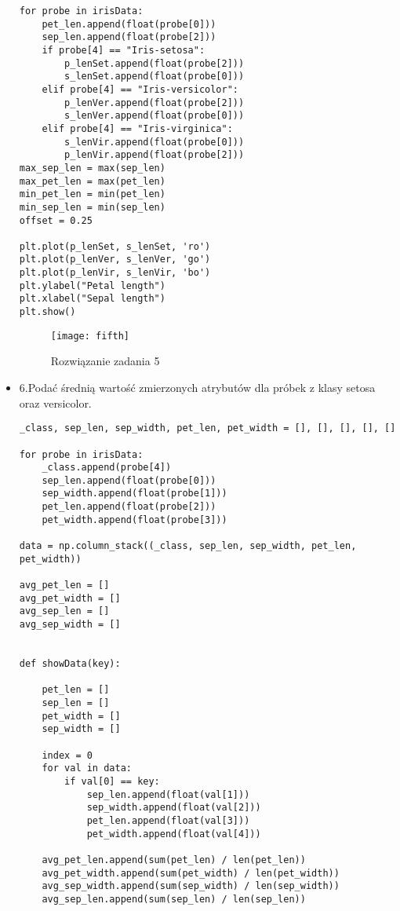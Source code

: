 \documentclass[12pt,a4paper]{article}
\begin{document}
\begin{itemize}
\begin{lstlisting}
for probe in irisData:
    pet_len.append(float(probe[0]))
    sep_len.append(float(probe[2]))
    if probe[4] == "Iris-setosa":
        p_lenSet.append(float(probe[2]))
        s_lenSet.append(float(probe[0]))
    elif probe[4] == "Iris-versicolor":
        p_lenVer.append(float(probe[2]))
        s_lenVer.append(float(probe[0]))
    elif probe[4] == "Iris-virginica":
        s_lenVir.append(float(probe[0]))
        p_lenVir.append(float(probe[2]))
max_sep_len = max(sep_len)
max_pet_len = max(pet_len)
min_pet_len = min(pet_len)
min_sep_len = min(sep_len)
offset = 0.25

plt.plot(p_lenSet, s_lenSet, 'ro')
plt.plot(p_lenVer, s_lenVer, 'go')
plt.plot(p_lenVir, s_lenVir, 'bo')
plt.ylabel("Petal length")
plt.xlabel("Sepal length")
plt.show()
	\end{lstlisting}
		\begin{figure}[h]
                        \texttt{[image: fifth]}
                        \centering
			\caption{Rozwiązanie zadania 5}
			\label{fig:fig5}
                \end{figure}
                \clearpage

        \item 6.Podać średnią wartość zmierzonych atrybutów dla próbek z klasy setosa oraz versicolor.
	\begin{lstlisting}
_class, sep_len, sep_width, pet_len, pet_width = [], [], [], [], []

for probe in irisData:
    _class.append(probe[4])
    sep_len.append(float(probe[0]))
    sep_width.append(float(probe[1]))
    pet_len.append(float(probe[2]))
    pet_width.append(float(probe[3]))

data = np.column_stack((_class, sep_len, sep_width, pet_len, pet_width))

avg_pet_len = []
avg_pet_width = []
avg_sep_len = []
avg_sep_width = []


def showData(key):

    pet_len = []
    sep_len = []
    pet_width = []
    sep_width = []

    index = 0
    for val in data:
        if val[0] == key:
            sep_len.append(float(val[1]))
            sep_width.append(float(val[2]))
            pet_len.append(float(val[3]))
            pet_width.append(float(val[4]))

    avg_pet_len.append(sum(pet_len) / len(pet_len))
    avg_pet_width.append(sum(pet_width) / len(pet_width))
    avg_sep_width.append(sum(sep_width) / len(sep_width))
    avg_sep_len.append(sum(sep_len) / len(sep_len))


\end{lstlisting}
\end{itemize}
\end{document}
